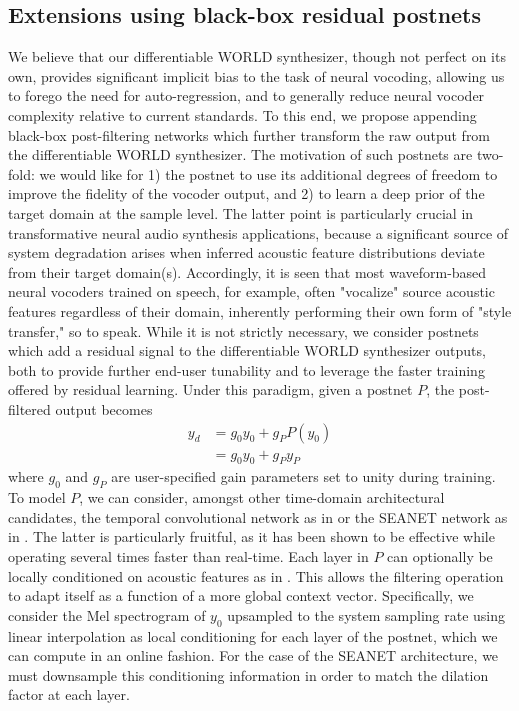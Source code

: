 \documentclass{article}
\begin{document}
\begin{sloppy}
\subsection{Extensions using black-box residual postnets}
\label{ssec:postnet}
We believe that our differentiable WORLD synthesizer, though not perfect on its own, provides significant implicit bias to the task of neural vocoding, allowing us to forego the need for auto-regression, and to generally reduce neural vocoder complexity relative to current standards.  To this end, we propose appending black-box post-filtering networks which further transform the raw output from the differentiable WORLD synthesizer.  The motivation of such postnets are two-fold:  we would like for 1) the postnet to use its additional degrees of freedom to improve the fidelity of the vocoder output, and 2) to learn a deep prior of the target domain at the sample level.  The latter point is particularly crucial in transformative neural audio synthesis applications, because a significant source of system degradation arises when inferred acoustic feature distributions deviate from their target domain(s).  Accordingly, it is seen that most waveform-based neural vocoders trained on speech, for example, often "vocalize" source acoustic features regardless of their domain, inherently performing their own form of "style transfer," so to speak.  While it is not strictly necessary, we consider postnets which add a residual signal to the differentiable WORLD synthesizer outputs, both to provide further end-user tunability and to leverage the faster training offered by residual learning.  Under this paradigm, given a postnet $P$, the post-filtered output becomes
\begin{equation}
\label{eqn:postnet}
\begin{split}
y_d & = g_0y_0+g_PP(y_0) \\
  & = g_0y_0+g_Py_P
\end{split}
\end{equation}
where $g_0$ and $g_P$ are user-specified gain parameters set to unity during training. To model $P$, we can consider, amongst other time-domain architectural candidates, the temporal convolutional network as in \cite{HifiGan} or the SEANET network as in \cite{SeaNet}.  The latter is particularly fruitful, as it has been shown to be effective while operating several times faster than real-time.  Each layer in $P$ can optionally be locally conditioned on acoustic features as in \cite{HifiGan2}.  This allows the filtering operation to adapt itself as a function of a more global context vector.  Specifically, we consider the Mel spectrogram of $y_0$ upsampled to the system sampling rate using linear interpolation as local conditioning for each layer of the postnet, which we can compute in an online fashion.  For the case of the SEANET architecture, we must downsample this conditioning information in order to match the dilation factor at each layer.


\end{sloppy}
\end{document}

